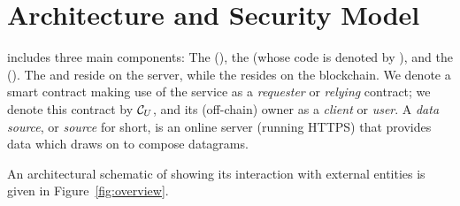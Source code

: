  \section{\tc Architecture and Security Model}
 \label{sec:architecture}

 \tcs includes three main components: The \tcontract (\tcont), the \encname (whose code is denoted by \engine), and the \medname (\relay). The \encname and \medname reside on the \tc server, while the \tcontract  resides on the blockchain. We denote a smart contract making use of the \tcs service as a {\em requester} or {\em relying} contract; we denote this contract by ${\cal C}_U$, and its (off-chain) owner as a \emph{client} or \emph{user}. A \emph{data source}, or \emph{source} for short, is an online server (running HTTPS) that provides data which \tc draws on to compose datagrams. 

An architectural schematic of \tc showing its interaction with external entities is given in Figure~\ref{fig:overview}.


